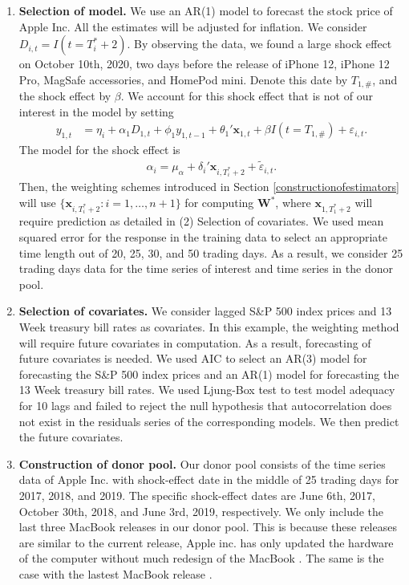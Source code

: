 \documentclass[11pt,3p,review,authoryear]{elsarticle}
\theoremstyle{definition}
\begin{document}
\begin{enumerate}[label = (\arabic*)]
  \item \textbf{Selection of model.}  We use an AR(1) model to forecast the stock price of Apple Inc. All the estimates will be adjusted for inflation.  We consider $D_{i, t} = I(t = T_i^*+2)$. By observing  the data, we found a large shock effect on October 10th, 2020, two days before the release of iPhone 12, iPhone 12 Pro, MagSafe accessories, and HomePod mini. Denote this date by $T_{1,\#}$, and the shock effect by $\beta$. We account for this shock effect that is not of our interest in the model by setting 
  \begin{align*}
    y_{1,t} &= \eta_i + \alpha_1 D_{1,t} +\phi_1y_{1, t-1}+\theta_1'\mathbf{x}_{1,t} + \beta I(t = T_{1,\#}) + \varepsilon_{i,t}.
  \end{align*}
  The model for the shock effect is
  \begin{align*}
    \alpha_i = \mu_{\alpha} + \delta_i'\mathbf{x}_{i,T_i^*+2}  + \tilde{\varepsilon}_{i,t}.
  \end{align*}
  Then, the weighting schemes introduced in Section \ref{constructionofestimators} will use  $\{\mathbf{x}_{i,T_i^*+2} \colon i = 1, \ldots, n+1\}$ for computing $\mathbf{W}^*$, where $\mathbf{x}_{1, T_1^*+2}$ will require prediction as detailed in (2) Selection of covariates. We used mean squared error for the response in the training data to select an appropriate time length out of 20, 25, 30, and 50 trading days. As a result, we consider 25 trading days data for the time series of interest and time series in the donor pool. 
  \item \textbf{Selection of covariates.} We consider lagged  S\&P 500 index prices and 13 Week treasury bill rates as covariates. In this example, the weighting method will require future covariates in computation. As a result, forecasting of future covariates is needed. We used AIC to select an AR(3) model for forecasting the S\&P 500 index prices and an AR(1)   model for forecasting the 13 Week treasury bill rates. We used Ljung-Box test to test  model adequacy for 10 lags and failed to reject the null hypothesis that autocorrelation does not exist in the residuals series of the corresponding models. We then predict the future covariates.
  \item \textbf{Construction of donor pool.} Our donor pool consists of the time series data of Apple Inc. with shock-effect date in the middle of 25 trading days for 2017, 2018, and 2019.  The specific shock-effect dates are June 6th, 2017, October 30th, 2018, and June 3rd, 2019, respectively. We only include the last three MacBook releases in our donor pool. This is because these releases are similar to the current release, Apple inc. has only updated the hardware of the computer without much redesign of the MacBook \citep{apple2017, apple2018, apple2019}. The same is the case with the lastest MacBook release \citep{apple2020}.  %
\end{enumerate}
\end{document}
